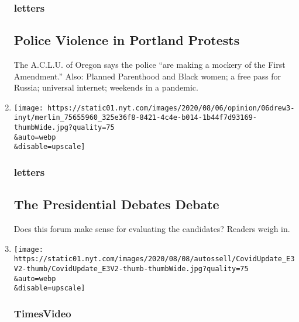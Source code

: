 \begin{enumerate}
  \hypertarget{letters-1}{%
  \subsubsection{letters}\label{letters-1}}

  \hypertarget{police-violence-in-portland-protests}{%
  \subsection{Police Violence in Portland
  Protests}\label{police-violence-in-portland-protests}}

  The A.C.L.U. of Oregon says the police ``are making a mockery of the
  First Amendment.'' Also: Planned Parenthood and Black women; a free
  pass for Russia; universal internet; weekends in a pandemic.
\item
  \href{/2020/08/07/opinion/letters/presidential-debates.html}{}

  \texttt{[image: https://static01.nyt.com/images/2020/08/06/opinion/06drew3-inyt/merlin\_75655960\_325e36f8-8421-4c4e-b014-1b44f7d93169-thumbWide.jpg?quality=75\\\&auto=webp\\\&disable=upscale]}

  \hypertarget{letters-2}{%
  \subsubsection{letters}\label{letters-2}}

  \hypertarget{the-presidential-debates-debate}{%
  \subsection{The Presidential Debates
  Debate}\label{the-presidential-debates-debate}}

  Does this forum make sense for evaluating the candidates? Readers
  weigh in.
\item
  \href{/video/opinion/100000007278127/coronavirus-vaccine-update.html}{}

  \texttt{[image: https://static01.nyt.com/images/2020/08/08/autossell/CovidUpdate\_E3V2-thumb/CovidUpdate\_E3V2-thumb-thumbWide.jpg?quality=75\\\&auto=webp\\\&disable=upscale]}

  \hypertarget{timesvideo}{%
  \subsubsection{TimesVideo}\label{timesvideo}}

  \hypertarget{covid-update-dont-rush-the-vaccine}{%
}
\end{enumerate}
